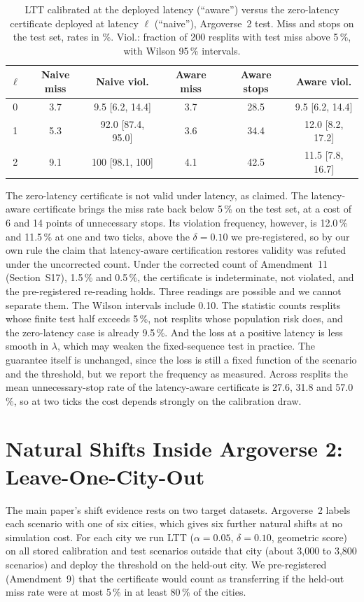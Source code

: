 \documentclass[lettersize,journal]{IEEEtran}
\begin{document}
\begin{table}[h]
\caption{LTT calibrated at the deployed latency (``aware'') versus the
zero-latency certificate deployed at latency $\ell$ (``naive''),
Argoverse~2 test. Miss and stops on the test set, rates in \%.
Viol.: fraction of 200 resplits with test miss above 5\,\%, with Wilson
95\,\% intervals.}
\label{tab:latency}
\centering
\scriptsize\setlength{\tabcolsep}{2.5pt}
\begin{tabular}{cccccc}
\toprule
$\ell$ & Naive miss & Naive viol. & Aware miss & Aware stops & Aware viol. \\
\midrule
0 & 3.7 & 9.5 [6.2, 14.4] & 3.7 & 28.5 & 9.5 [6.2, 14.4] \\
1 & 5.3 & 92.0 [87.4, 95.0] & 3.6 & 34.4 & 12.0 [8.2, 17.2] \\
2 & 9.1 & 100 [98.1, 100] & 4.1 & 42.5 & 11.5 [7.8, 16.7] \\
\bottomrule
\end{tabular}
\end{table}

The zero-latency certificate is not valid under latency, as claimed.
The latency-aware certificate brings the miss rate back below 5\,\% on the
test set, at a cost of 6 and 14 points of unnecessary stops. Its
violation frequency, however, is 12.0\,\% and 11.5\,\% at one and two ticks,
above the $\delta = 0.10$ we pre-registered, so by our own rule the claim
that latency-aware certification restores validity was refuted under the uncorrected count. Under the corrected count of Amendment~11 (Section~S17), 1.5\,\% and 0.5\,\%, the certificate is indeterminate, not violated, and the pre-registered re-reading holds. Three
readings are possible and we cannot separate them. The Wilson intervals
include 0.10. The statistic counts resplits whose finite test half
exceeds 5\,\%, not resplits whose population risk does, and the
zero-latency case is already 9.5\,\%. And the loss at a positive latency
is less smooth in $\lambda$, which may weaken the fixed-sequence test in
practice. The guarantee itself is unchanged, since the loss is still a
fixed function of the scenario and the threshold, but we report the
frequency as measured. Across resplits the mean unnecessary-stop rate of
the latency-aware certificate is 27.6, 31.8 and 57.0\,\%, so at two ticks
the cost depends strongly on the calibration draw.

\section{Natural Shifts Inside Argoverse 2: Leave-One-City-Out}
\label{sec:s-city}
The main paper's shift evidence rests on two target datasets. Argoverse~2
labels each scenario with one of six cities, which gives six further
natural shifts at no simulation cost. For each city we run LTT
($\alpha = 0.05$, $\delta = 0.10$, geometric score) on all stored
calibration and test scenarios outside that city (about 3{,}000 to
3{,}800 scenarios) and deploy the threshold on the held-out city. We
pre-registered (Amendment~9) that the certificate would count as
transferring if the held-out miss rate were at most 5\,\% in at least 80\,\%
of the cities.
\end{document}
